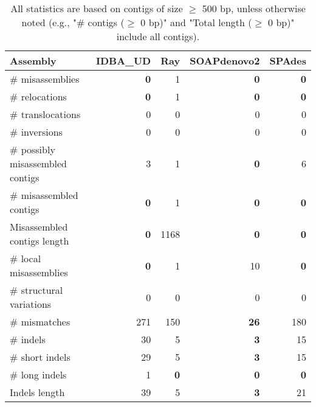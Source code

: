 \documentclass[12pt,a4paper]{article}
\begin{document}
\begin{table}[ht]
\begin{center}
\caption{All statistics are based on contigs of size $\geq$ 500 bp, unless otherwise noted (e.g., "\# contigs ($\geq$ 0 bp)" and "Total length ($\geq$ 0 bp)" include all contigs).}
\begin{tabular}{|l*{4}{|r}|}
\hline
Assembly & IDBA\_UD & Ray & SOAPdenovo2 & SPAdes \\ \hline
\# misassemblies & {\bf 0} & 1 & {\bf 0} & {\bf 0} \\ \hline
\hspace{5mm}\# relocations & {\bf 0} & 1 & {\bf 0} & {\bf 0} \\ \hline
\hspace{5mm}\# translocations & 0 & 0 & 0 & 0 \\ \hline
\hspace{5mm}\# inversions & 0 & 0 & 0 & 0 \\ \hline
\# possibly misassembled contigs & 3 & 1 & {\bf 0} & 6 \\ \hline
\# misassembled contigs & {\bf 0} & 1 & {\bf 0} & {\bf 0} \\ \hline
Misassembled contigs length & {\bf 0} & 1168 & {\bf 0} & {\bf 0} \\ \hline
\# local misassemblies & {\bf 0} & 1 & 10 & {\bf 0} \\ \hline
\# structural variations & 0 & 0 & 0 & 0 \\ \hline
\# mismatches & 271 & 150 & {\bf 26} & 180 \\ \hline
\# indels & 30 & 5 & {\bf 3} & 15 \\ \hline
\hspace{5mm}\# short indels & 29 & 5 & {\bf 3} & 15 \\ \hline
\hspace{5mm}\# long indels & 1 & {\bf 0} & {\bf 0} & {\bf 0} \\ \hline
Indels length & 39 & 5 & {\bf 3} & 21 \\ \hline
\end{tabular}
\end{center}
\end{table}
\end{document}
